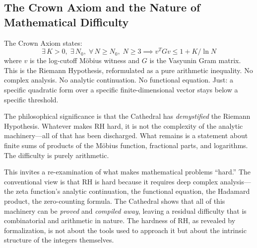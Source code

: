 \subsection{The Crown Axiom and the Nature of Mathematical Difficulty}

The Crown Axiom states:
\[
  \exists\, K > 0,\; \exists\, N_0,\; \forall\, N \geq N_0,\;
  N \geq 3 \implies
  v^T G v \leq 1 + K / \ln N
\]
where $v$ is the log-cutoff Möbius witness and $G$ is the Vasyunin
Gram matrix. This is the Riemann Hypothesis, reformulated as a
pure arithmetic inequality. No complex analysis. No analytic
continuation. No functional equation. Just: a specific
quadratic form over a specific finite-dimensional vector
stays below a specific threshold.

The philosophical significance is that the Cathedral has
\emph{demystified} the Riemann Hypothesis. Whatever makes RH
hard, it is not the complexity of the analytic machinery---all
of that has been discharged. What remains is a statement about
finite sums of products of the Möbius function, fractional parts,
and logarithms. The difficulty is purely arithmetic.

This invites a re-examination of what makes mathematical problems
``hard.'' The conventional view is that RH is hard because it
requires deep complex analysis---the zeta function's analytic
continuation, the functional equation, the Hadamard product, the
zero-counting formula. The Cathedral shows that all of this
machinery can be \emph{proved} and \emph{compiled away}, leaving
a residual difficulty that is combinatorial and arithmetic in
nature. The hardness of RH, as revealed by formalization, is not
about the tools used to approach it but about the intrinsic
structure of the integers themselves.
